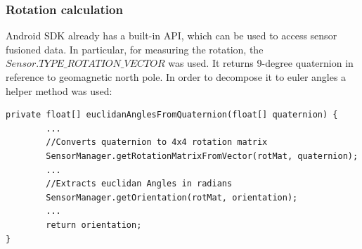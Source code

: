 \subsubsection{Rotation calculation}
Android SDK already has a built-in API, which can be used to access sensor fusioned data. In particular, for measuring the rotation, the $Sensor.TYPE\_ROTATION\_VECTOR$ was used. It returns 9-degree quaternion in reference to geomagnetic north pole. In order to decompose it to euler angles a helper method was used:
\lstset{escapechar=@,style=customjava}
\begin{lstlisting}
private float[] euclidanAnglesFromQuaternion(float[] quaternion) {
        ...
        //Converts quaternion to 4x4 rotation matrix
        SensorManager.getRotationMatrixFromVector(rotMat, quaternion);
        ...
        //Extracts euclidan Angles in radians
        SensorManager.getOrientation(rotMat, orientation);
        ...
        return orientation;
}
\end{lstlisting}
